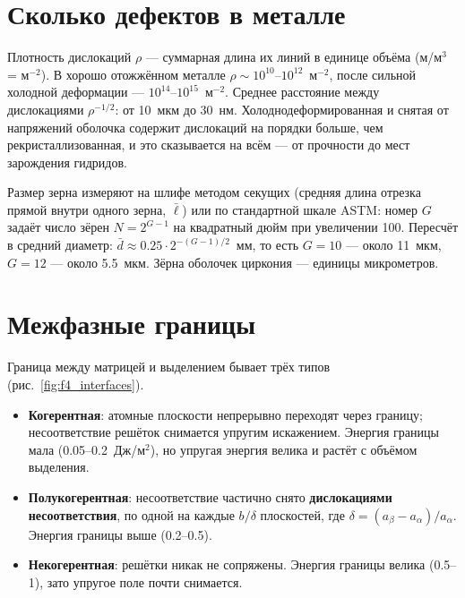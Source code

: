 \section{Сколько дефектов в металле}

Плотность дислокаций $\rho$ --- суммарная длина их линий в единице объёма (м/м$^3$ = м$^{-2}$). В хорошо отожжённом
металле $\rho\sim10^{10}$--$10^{12}$~м$^{-2}$, после сильной холодной деформации --- $10^{14}$--$10^{15}$~м$^{-2}$.
Среднее расстояние между дислокациями $\rho^{-1/2}$: от 10~мкм до 30~нм. Холоднодеформированная и снятая от
напряжений оболочка содержит дислокаций на порядки больше, чем рекристаллизованная, и это сказывается на всём ---
от прочности до мест зарождения гидридов.

Размер зерна измеряют на шлифе методом секущих (средняя длина отрезка прямой внутри одного зерна, $\bar\ell$) или
по стандартной шкале ASTM: номер $G$ задаёт число зёрен $N = 2^{G-1}$ на квадратный дюйм при увеличении 100.
Пересчёт в средний диаметр: $\bar d\approx 0.25\cdot2^{-(G-1)/2}$~мм, то есть $G = 10$ --- около 11~мкм, $G = 12$ ---
около 5.5~мкм. Зёрна оболочек циркония --- единицы микрометров.

\section{Межфазные границы}

Граница между матрицей и выделением бывает трёх типов (рис.~\ref{fig:f4_interfaces}).
\begin{itemize}
\item \textbf{Когерентная}: атомные плоскости непрерывно переходят через границу; несоответствие решёток
  снимается упругим искажением. Энергия границы мала (0.05--0.2~Дж/м$^2$), но упругая энергия велика и растёт с
  объёмом выделения.
\item \textbf{Полукогерентная}: несоответствие частично снято \textbf{дислокациями несоответствия}, по одной на
  каждые $b/\delta$ плоскостей, где $\delta = (a_\beta - a_\alpha)/a_\alpha$. Энергия границы выше (0.2--0.5).
\item \textbf{Некогерентная}: решётки никак не сопряжены. Энергия границы велика (0.5--1), зато упругое поле
  почти снимается.
\end{itemize}


